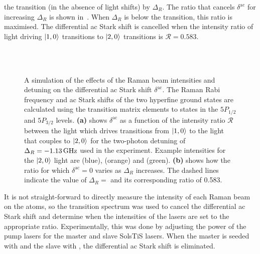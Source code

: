 the  transition (in the absence of light shifts) by
$\Delta_R$. The ratio that cancels
\(\delta^\text{ac}\) for increasing \(\Delta_R\) is shown
in~. When \(\Delta_R\) is
 below the  transition, this
ratio is maximised. The differential ac Stark shift is cancelled when
the intensity ratio of light driving \(\ket{1,0}\) transitions to
\(\ket{2,0}\) transitions is \(\mathcal{R} = 0.583\). 
\begin{figure}[htbp!]
	\centering
	\def\svgwidth{\columnwidth}
	\\
\\
	\caption[Differential ac Stark shift as a function of two-photon
  detuning and Raman beam intensities.]{A simulation of the effects of the Raman beam
  intensities and detuning on the differential ac Stark shift
  \(\delta^\text{ac}\). The Raman Rabi frequency and ac Stark shifts
  of the two hyperfine ground states are calculated using the
  transition matrix elements to states in the $5P_{1/2}$ and
  $5P_{3/2}$ levels.
\textbf{(a)} shows \(\delta^\text{ac}\) as a function of the intensity ratio
\(\mathcal{R}\) between the light which drives transitions from
\(\ket{1,0}\) to the light that couples to \(\ket{2,0}\) for the
two-photon detuning of \(\Delta_R = -\sivalue{1.13}{\giga\hertz}\)
used in the experiment. Example
intensities for the \(\ket{2,0}\) light are
 (blue),
 (orange) and
 (green). \textbf{(b)} shows how
the ratio for which \(\delta^\text{ac} = 0\) varies as \(\Delta_R\)
increases. The dashed lines indicate the value of \(\Delta_R =\)
 and its corresponding ratio of 0.583.}
	\label{fig:light_shift_plots}
\end{figure}
\par\noindent
It is not straight-forward to directly measure the intensity of
each Raman beam on the atoms, so the transition spectrum was used to cancel the
differential ac Stark shift and determine when the intensities of the
lasers are set to the appropriate
ratio. Experimentally, this was done by adjusting the power of the
pump lasers for the master and slave SolsTiS lasers. When the master
is seeded with  and the slave with
, the differential ac Stark shift is eliminated.
